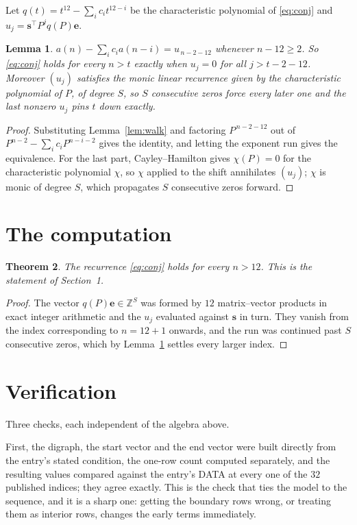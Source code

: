 \documentclass[11pt,a4paper]{article}
\theoremstyle{plain}
\newtheorem{theorem}{Theorem}
\newtheorem{lemma}[theorem]{Lemma}
\theoremstyle{definition}
\begin{document}
Let $q(t)=t^{12}-\sum_i c_i t^{12-i}$ be the characteristic polynomial of
\eqref{eq:conj} and $u_j=\mathbf{s}^{\!\top}P^{j}q(P)\mathbf{e}$.

\begin{lemma}\label{lem:crit}
$a(n)-\sum_i c_i a(n-i)=u_{\,n-2-12}$ whenever $n-12\ge2$. So \eqref{eq:conj}
holds for every $n>t$ exactly when $u_j=0$ for all $j>t-2-12$. Moreover $(u_j)$
satisfies the monic linear recurrence given by the characteristic polynomial of $P$, of
degree $S$, so $S$ consecutive zeros force every later one and the last nonzero $u_j$ pins
$t$ down exactly.
\end{lemma}

\begin{proof}
Substituting Lemma~\ref{lem:walk} and factoring $P^{\,n-2-12}$ out of
$P^{n-2}-\sum_i c_i P^{n-i-2}$ gives the identity, and letting the exponent run gives the
equivalence. For the last part, Cayley--Hamilton gives $\chi(P)=0$ for the characteristic
polynomial $\chi$, so $\chi$ applied to the shift annihilates $(u_j)$; $\chi$ is monic of
degree $S$, which propagates $S$ consecutive zeros forward.
\end{proof}

\section{The computation}

\begin{theorem}
The recurrence \eqref{eq:conj} holds for every $n>12$. This is the statement of
Section~1.
\end{theorem}

\begin{proof}
The vector $q(P)\mathbf{e}\in\mathbb{Z}^{S}$ was formed by $12$ matrix--vector
products in exact integer arithmetic and the $u_j$ evaluated against $\mathbf{s}$ in turn.
They vanish from the index corresponding to $n=12+1$ onwards, and the run was continued
past $S$ consecutive zeros, which by Lemma~\ref{lem:crit} settles every larger index.
\end{proof}

\section{Verification}

Three checks, each independent of the algebra above.

First, the digraph, the start vector and the end vector were built directly from the
entry's stated condition, the one-row count computed separately, and the resulting values
compared against the entry's DATA at every one of the $32$ published indices; they
agree exactly. This is the check that ties the model to the sequence, and it is a sharp one:
getting the boundary rows wrong, or treating them as interior rows, changes the early terms
immediately.
\end{document}
